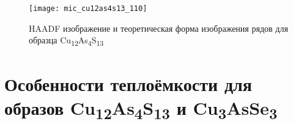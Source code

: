 


\begin{figure}[pt!]
\centering
  \begin{minipage}[ht]{0.7\linewidth}\centering
    \texttt{[image: mic\_cu12as4s13\_110]} \\
  \end{minipage}

  \caption[HAADF изображение и теоретическая форма изображения рядов для образца Cu\textsubscript{12}As\textsubscript{4}S\textsubscript{13}]{HAADF изображение и теоретическая форма изображения рядов для образца Cu\textsubscript{12}As\textsubscript{4}S\textsubscript{13}}
    \label{img:mic3}
\end{figure}

\clearpage

\newpage

\section{Особенности теплоёмкости для образов Cu\textsubscript{12}As\textsubscript{4}S\textsubscript{13} и Cu\textsubscript{3}AsSe\textsubscript{3} } \label{sect3_2}

